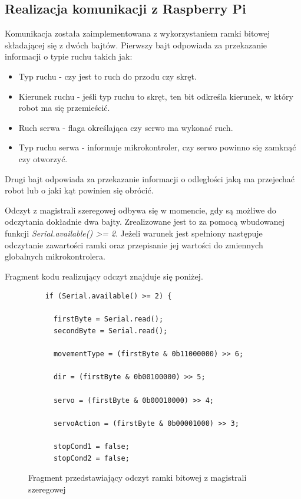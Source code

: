 \subsection{Realizacja komunikacji z Raspberry Pi}

Komunikacja została zaimplementowana z wykorzystaniem ramki bitowej składającej się z dwóch bajtów. Pierwszy bajt odpowiada za przekazanie informacji o typie ruchu takich jak:
\begin{itemize}
  \item Typ ruchu - czy jest to ruch do przodu czy skręt.
  \item Kierunek ruchu - jeśli typ ruchu to skręt, ten bit odkreśla kierunek, w który robot ma się przemieścić.
  \item Ruch serwa - flaga określająca czy serwo ma wykonać ruch.
  \item Typ ruchu serwa - informuje mikrokontroler, czy serwo powinno się zamknąć czy otworzyć. 
\end{itemize}

Drugi bajt odpowiada za przekazanie informacji o odległości jaką ma przejechać robot lub o jaki kąt powinien się obrócić. 

Odczyt z magistrali szeregowej odbywa się w momencie, gdy są możliwe do odczytania dokładnie dwa bajty. Zrealizowane jest to za pomocą wbudowanej funkcji \textit{Serial.available() >= 2}. Jeżeli warunek jest spełniony następuje odczytanie zawartości ramki oraz przepisanie jej wartości do zmiennych globalnych mikrokontrolera. 

Fragment kodu realizujący odczyt znajduje się poniżej.

\begin{figure}[h!]
  \centering
  \begin{lstlisting}
    if (Serial.available() >= 2) {  
      
      firstByte = Serial.read();
      secondByte = Serial.read();

      movementType = (firstByte & 0b11000000) >> 6;

      dir = (firstByte & 0b00100000) >> 5;

      servo = (firstByte & 0b00010000) >> 4;

      servoAction = (firstByte & 0b00001000) >> 3;

      stopCond1 = false;
      stopCond2 = false;
  \end{lstlisting}
  \caption{Fragment przedstawiający odczyt ramki bitowej z magistrali szeregowej}
  \label{fig:read-uart}
\end{figure}

